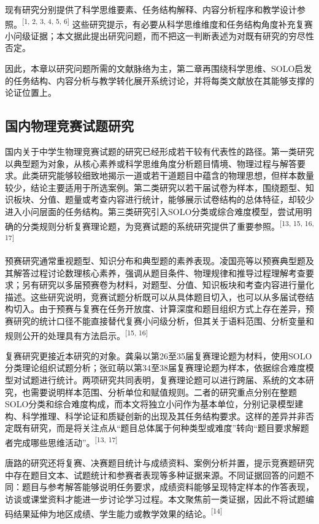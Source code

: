 \documentclass[
  12pt,
  a4paper]{ctexbook}
\begin{document}
现有研究分别提供了科学思维要素、任务结构解释、内容分析程序和教学设计参照。\textsuperscript{[1, 2, 3, 4, 5, 6]}
这些研究提示，有必要从科学思维维度和任务结构角度补充复赛小问级证据；本文据此提出研究问题，而不把这一判断表述为对既有研究的穷尽性否定。

因此，本章以研究问题所需的文献脉络为主，第二章再围绕科学思维、SOLO启发的任务结构、内容分析与教学转化展开系统讨论，并将每类文献放在其能够支撑的论证位置上。

\subsection{国内物理竞赛试题研究}\label{ux56fdux5185ux7269ux7406ux7adeux8d5bux8bd5ux9898ux7814ux7a76}

国内关于中学生物理竞赛试题的研究已经形成若干较有代表性的路径。第一类研究以典型题为对象，从核心素养或科学思维角度分析题目情境、物理过程与解答要求。此类研究能够较细致地揭示一道或若干道题目中蕴含的物理思想，但样本数量较少，结论主要适用于所选案例。第二类研究以若干届试卷为样本，围绕题型、知识板块、分值、题量或考查内容进行统计，能够展示试卷结构的总体特征，却较少进入小问层面的任务结构。第三类研究引入SOLO分类或综合难度模型，尝试用明确的分类规则分析复赛理论题，为竞赛试题的系统研究提供了重要参照。\textsuperscript{[13, 15, 16, 17]}

预赛研究通常重视题型、知识分布和典型题的素养表现。凌国亮等以预赛典型题及其解答过程讨论数理核心素养，强调从题目条件、物理规律和推导过程理解考查要求；另有研究以多届预赛卷为材料，对题型、分值、知识板块和考查内容进行量化描述。这些研究说明，竞赛试题分析既可以从具体题目切入，也可以从多届试卷结构切入。由于预赛与复赛在任务开放度、计算深度和题目组织方式上存在差异，预赛研究的统计口径不能直接替代复赛小问级分析，但其关于语料范围、分析变量和规则公开的处理具有方法启示。\textsuperscript{[15, 16]}

复赛研究更接近本研究的对象。龚枭以第26至35届复赛理论题为材料，使用SOLO分类理论组织试题分析；张豇萌以第34至38届复赛理论题为样本，依据综合难度模型对试题进行统计。两项研究共同表明，复赛理论题可以进行跨届、系统的文本研究，也需要说明样本范围、分析单位和赋值规则。二者的研究重点分别在整题SOLO分类和综合难度构成，而本文将独立小问作为基本单位，分别记录模型建构、科学推理、科学论证和质疑创新的出现及其任务结构要求。这样的差异并非否定既有研究，而是将关注点从``题目总体属于何种类型或难度''转向``题目要求解题者完成哪些思维活动''。\textsuperscript{[13, 17]}

唐路的研究还将复赛、决赛题目统计与成绩资料、案例分析并置，提示竞赛题研究中存在题目文本、试题统计和参赛者表现等多种证据来源。不同证据回答的问题不同：题目与参考解答能够说明任务要求，成绩资料能够呈现特定样本的作答表现，访谈或课堂资料才能进一步讨论学习过程。本文聚焦前一类证据，因此不将试题编码结果延伸为地区成绩、学生能力或教学效果的结论。\textsuperscript{[14]}
\end{document}
